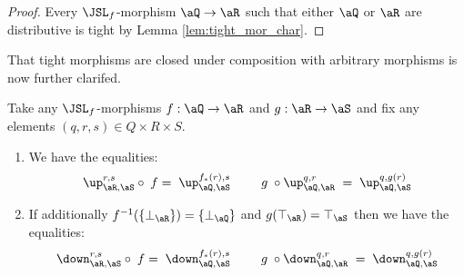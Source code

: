 \documentclass{article}
\begin{document}
\begin{proof}
Every $\JSL_f$-morphism $\aQ \to \aR$ such that either $\aQ$ or $\aR$ are distributive is tight by Lemma \ref{lem:tight_mor_char}.
\end{proof}

That tight morphisms are closed under composition with arbitrary morphisms is now further clarifed.

\begin{lemma}
\label{lem:compose_spec_gen_mor}
\item
Take any $\JSL_f$-morphisms $f : \aQ \to \aR$ and $g : \aR \to \aS$ and fix any elements $(q,r,s)  \in Q \times R \times S$.

\begin{enumerate}
\item
We have the equalities:
\[
\begin{tabular}{lll}
$\up_{\aR,\aS}^{r,s}  \circ \; f = \; \up_{\aQ,\aS}^{f_*(r),s}$
&&
$g \; \circ \up_{\aQ,\aR}^{q,r} \; = \; \up_{\aQ,\aS}^{q,g(r)}$
\end{tabular}
\]

\item
If additionally $f^{-1}(\{\bot_\aR\}) = \{\bot_\aQ\}$ and $g(\top_\aR) = \top_\aS$ then we have the equalities:
\[
\begin{tabular}{lll}
$\down_{\aR,\aS}^{r,s}  \circ \; f = \; \down_{\aQ,\aS}^{f_*(r),s}$
&&
$g \; \circ \down_{\aQ,\aR}^{q,r} \; = \; \down_{\aQ,\aS}^{q,g(r)}$
\end{tabular}
\]

\end{enumerate}
\end{lemma}
\end{document}
